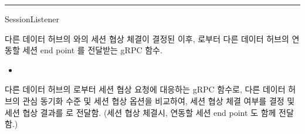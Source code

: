 \documentclass[a4paper,10pt,english]{sphinxmanual}
\begin{document}
\bigskip\hrule\bigskip


\begin{fulllineitems}
\label{\detokenize{_SessionListener:SessionListener}}
\pysigstartsignatures
{}
\pysigstopsignatures
\sphinxAtStartPar
SessionListener

\begin{fulllineitems}
\label{\detokenize{_SessionListener:SessionListener._ackSN}}
\pysigstartsignatures
{}
\pysigstopsignatures
\sphinxAtStartPar
다른 데이터 허브의 {\hyperref[\detokenize{_SessionRequester:sessionrequester}]{}} 와의 세션 협상 체결이 결정된 이후,
{\hyperref[\detokenize{_SessionRequester:sessionrequester}]{}} 로부터 다른 데이터 허브의 연동할 세션 end point 를 전달받는 gRPC 함수.


\nopagebreak

\begin{itemize}
\item {} 
\sphinxAtStartPar
{\hyperref[\detokenize{_SessionRequester:SessionRequester._snProcess}]{}}

\end{itemize}



\end{fulllineitems}


\begin{fulllineitems}
\label{\detokenize{_SessionListener:SessionListener._requestSN}}
\pysigstartsignatures
{}
\pysigstopsignatures
\sphinxAtStartPar
다른 데이터 허브의 {\hyperref[\detokenize{_SessionRequester:sessionrequester}]{}} 로부터 세션 협상 요청에 대응하는 gRPC 함수로,
다른 데이터 허브의 관심 동기화 수준 및 세션 협상 옵션을 비교하여, 세션 협상 체결 여부를 결정 및 세션 협상 결과를 {\hyperref[\detokenize{_SessionRequester:sessionrequester}]{}} 로 전달함.
(세션 협상 체결시, 연동할 세션 end point 도 함께 전달함.)



\end{fulllineitems}
\end{fulllineitems}
\end{document}
